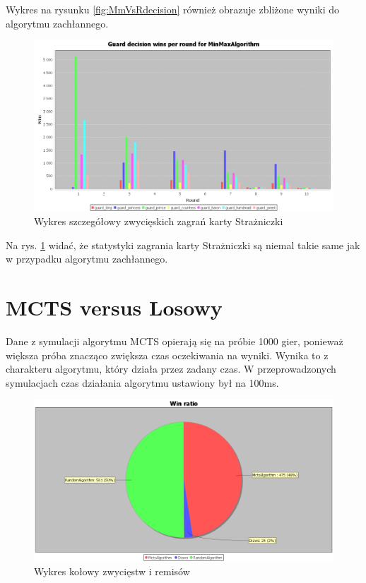 Wykres na rysunku \ref{fig:MmVsRdecision} również obrazuje zbliżone wyniki do algorytmu zachłannego.

\begin{figure}[H]
	\centering
	\includegraphics[width=\textwidth]{Resources/MmVsR/MmVsRguarddecision.PNG}
	\caption{Wykres szczegółowy zwycięskich zagrań karty Strażniczki} 
	\label{fig:MmVsRguarddecision}
\end{figure}

Na rys. \ref{fig:MmVsRguarddecision} widać, że statystyki zagrania karty Strażniczki są niemal takie same jak w przypadku algorytmu zachłannego.

\section{MCTS versus Losowy}

Dane z symulacji algorytmu MCTS opierają się na próbie 1000 gier, ponieważ większa próba znacząco zwiększa czas oczekiwania na wyniki. Wynika to z charakteru algorytmu, który działa przez zadany czas. W przeprowadzonych symulacjach czas działania algorytmu ustawiony był na 100ms.

\begin{figure}[H]
	\centering
	\includegraphics[width=\textwidth]{Resources/MctsVsR/MctsVsRwin.PNG}
	\caption{Wykres kołowy zwycięstw i remisów} 
	\label{fig:MctsVsRwin}
\end{figure}

